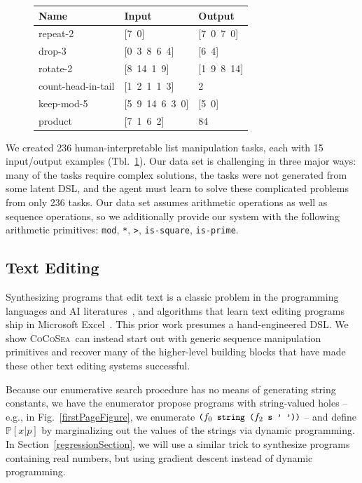 \documentclass{article}
\newcommand{\system}{\textsc{CoCoSea}~}
\newcommand{\code}[1]{{\footnotesize\texttt{#1}}}
\newcommand{\probability}{\mathds{P}} %
\begin{document}
\begin{figure}\centering
  \begin{tabular}{lll}
    \toprule
    Name & Input & Output \\\midrule
    repeat-2 & [7\, 0] & [7\, 0\, 7\, 0] \\
    drop-3 & [0\, 3\, 8\, 6\, 4] & [6\, 4] \\
    rotate-2 & [8\, 14\, 1\, 9] & [1\, 9\, 8\, 14] \\
    count-head-in-tail & [1\, 2\, 1\, 1\, 3] & 2 \\
    keep-mod-5 & [5\, 9\, 14\, 6\, 3\, 0] & [5\, 0] \\
    product & [7\, 1\, 6\, 2] & 84 \\
    \bottomrule
  \end{tabular}
  \label{listexamples}
\end{figure}
We created 236 human-interpretable list manipulation tasks, each with 15
input/output examples (Tbl.~\ref{listexamples}).
Our data set is challenging in three major ways: many of the tasks require
complex solutions, the tasks were not generated from some latent DSL, and
the agent must learn to solve these complicated problems from only 236
tasks.
Our data set assumes arithmetic operations as well as sequence operations,
so we additionally provide our system with the following arithmetic
primitives: \code{mod}, \code{*}, \code{>}, \code{is-square},
\code{is-prime}.


\subsection{Text Editing}\label{textSection}
Synthesizing programs that edit text is a classic problem in the
programming languages and AI literatures~\cite{menon2013machine,lau2001programming},
and algorithms that learn text editing programs ship in Microsoft Excel~\cite{gulwani2011automating}.
This prior work presumes a hand-engineered DSL.
We show \system can instead start out with generic sequence manipulation
primitives and recover many of the higher-level building blocks that have
made these other text editing systems successful.

Because our enumerative search procedure has no means of generating
string constants, we have the enumerator propose programs with string-valued holes --
e.g., in Fig.~\ref{firstPageFigure},
we enumerate $\text{\code{(}}f_0\code{ string (}f_2\text{\code{ s ' '))}}$ --
and define $\probability[x|p]$ by marginalizing out the values of the
strings via dynamic programming.  In Section~\ref{regressionSection},
we will use a similar trick to synthesize programs containing real
numbers, but using gradient descent instead of dynamic programming.
\end{document}
